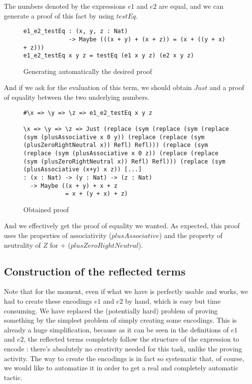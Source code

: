 The numbers denoted by the expressions $e1$ and $e2$ are equal, and we can generate a proof of this fact by using $testEq$.

\begin{figure}[H]
\figrule
\begin{center}
\begin{lstlisting}
e1_e2_testEq : (x, y, z : Nat) 
             -> Maybe (((x + y) + (x + z)) = (x + ((y + x) + z)))
e1_e2_testEq x y z = testEq (e1 x y z) (e2 x y z)
\end{lstlisting}
\end{center}
\caption{Generating automatically the desired proof}
\figrule
\end{figure}


And if we ask for the evaluation of this term, we should obtain $Just$ and a proof of equality between the two underlying numbers.

\begin{figure}[H]
\figrule
\begin{center}
\begin{lstlisting}
#\x => \y => \z => e1_e2_testEq x y z

\x => \y => \z => Just (replace (sym (replace (sym (replace 
(sym (plusAssociative x 0 y)) (replace (replace (sym 
(plusZeroRightNeutral x)) Refl) Refl))) (replace (sym 
(replace (sym (plusAssociative x 0 z)) (replace (replace 
(sym (plusZeroRightNeutral x)) Refl) Refl))) (replace (sym 
(plusAssociative (x+y) x z)) [...]
: (x : Nat) -> (y : Nat) -> (z : Nat) 
  -> Maybe ((x + y) + x + z 
            = x + (y + x) + z)
\end{lstlisting}
\end{center}
\caption{Obtained proof}
\figrule
\end{figure}

And we effectively get the proof of equality we wanted. As expected, this proof uses the properties of associativity ($plusAssociative$) and the property of neutrality of $Z$ for $+$ ($plusZeroRightNeutral$).


\subsection{Construction of the reflected terms}

Note that for the moment, even if what we have is perfectly usable and works, we had to create these encodings $e1$ and $e2$ by hand, which is easy but time consuming. We have replaced the (potentially hard) problem of proving something by the simplest problem of simply creating some encodings. This is already a huge simplification, because as it can be seen in the definitions of $e1$ and $e2$, the reflected terms completely follow the structure of the expression to encode : there's absolutely no creativity needed for this task, unlike the proving activity. The way to create the encodings is in fact so systematic that, of course, we would like to automatize it in order to get a real and completely automatic tactic.

